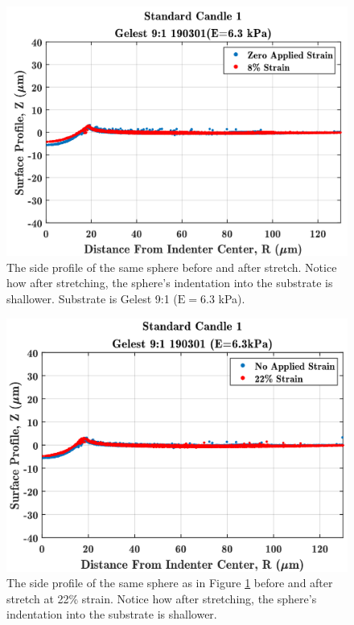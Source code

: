 \begin{figure}[h!]
	\centering
	\includegraphics[width=\linewidth]{Chapters/Figures/stretch_v_unstretched_0-88-ST1}
	\caption[Side Profile Comparison: 8\%]{The side profile of the same sphere before and after stretch. Notice how after stretching, the sphere's indentation into the substrate is shallower. Substrate is Gelest 9:1 ($\text{E}=6.3$ kPa).}	
	\label{fig:sc1unstretchedv8ml}
\end{figure}
\begin{figure}
	\centering
	\includegraphics[width=\linewidth]{Chapters/Figures/stretch_v_unstretched_0-22-ST1}
	\caption[Side Profile Comparison: 22\%]{The side profile of the same sphere as in Figure \ref{fig:sc1unstretchedv8ml} before and after stretch at 22\% strain. Notice how after stretching, the sphere's indentation into the substrate is shallower.}
	\label{fig:stretchvunstretched0-22-st1}
\end{figure}

